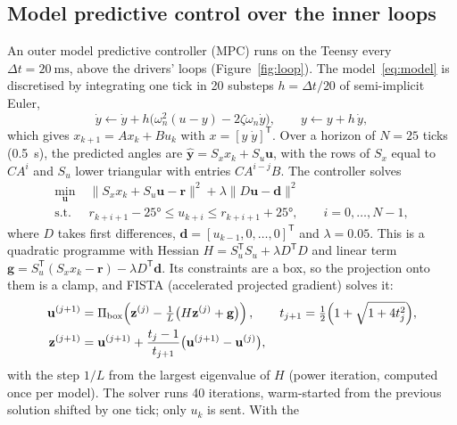 \documentclass[11pt,a4paper]{article}
\begin{document}
\subsection{Model predictive control over the inner loops}

An outer model predictive controller (MPC) runs on the Teensy every $\Delta t=\SI{20}{\milli\second}$, above
the drivers' loops (Figure~\ref{fig:loop}). The model~\eqref{eq:model} is discretised by integrating one tick
in 20 substeps $h=\Delta t/20$ of semi-implicit Euler,
\begin{equation}
  \dot y\leftarrow\dot y+h\bigl(\omega_n^2(u-y)-2\zeta\omega_n\dot y\bigr),\qquad y\leftarrow y+h\,\dot y ,
\end{equation}
which gives $x_{k+1}=Ax_k+Bu_k$ with $x=[y\;\dot y]^{\mathsf T}$. Over a horizon of $N=25$ ticks
(\SI{0.5}{\second}), the predicted angles are $\hat{\mathbf y}=S_xx_k+S_u\mathbf u$, with the rows of $S_x$ equal
to $CA^{i}$ and $S_u$ lower triangular with entries $CA^{i-j}B$. The controller solves
\begin{equation}
\begin{aligned}
  \min_{\mathbf u}\;& \bigl\lVert S_xx_k+S_u\mathbf u-\mathbf r\bigr\rVert^2+\lambda\bigl\lVert D\mathbf u-\mathbf d\bigr\rVert^2\\
  \text{s.t.}\;& r_{k+i+1}-\ang{25}\le u_{k+i}\le r_{k+i+1}+\ang{25},\qquad i=0,\dots,N-1,
\end{aligned}
\end{equation}
where $D$ takes first differences, $\mathbf d=[u_{k-1},0,\dots,0]^{\mathsf T}$ and $\lambda=0.05$. This is a
quadratic programme with Hessian $H=S_u^{\mathsf T}S_u+\lambda D^{\mathsf T}D$ and linear term
$\mathbf g=S_u^{\mathsf T}(S_xx_k-\mathbf r)-\lambda D^{\mathsf T}\mathbf d$. Its constraints are a box, so the
projection onto them is a clamp, and FISTA (accelerated projected gradient) solves it:
\begin{equation}
\begin{aligned}
  \mathbf u^{(j+1)}&=\Pi_{\mathrm{box}}\!\left(\mathbf z^{(j)}-\tfrac1L\bigl(H\mathbf z^{(j)}+\mathbf g\bigr)\right),\qquad
  t_{j+1}=\tfrac12\Bigl(1+\sqrt{1+4t_j^2}\Bigr),\\
  \mathbf z^{(j+1)}&=\mathbf u^{(j+1)}+\frac{t_j-1}{t_{j+1}}\bigl(\mathbf u^{(j+1)}-\mathbf u^{(j)}\bigr),
\end{aligned}
\end{equation}
with the step $1/L$ from the largest eigenvalue of $H$ (power iteration, computed once per model). The solver
runs 40 iterations, warm-started from the previous solution shifted by one tick; only $u_k$ is sent. With the
\end{document}
